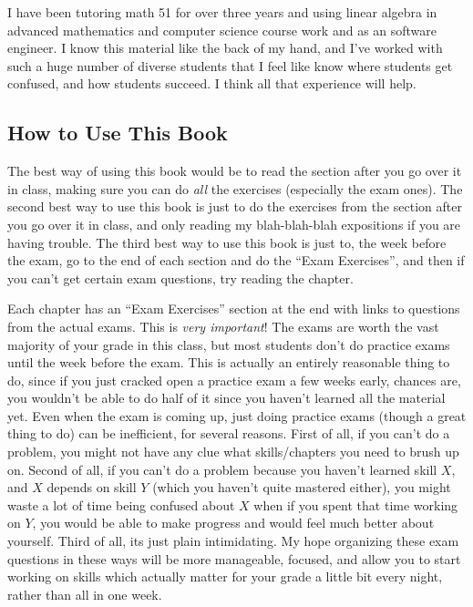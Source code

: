 I have been tutoring math 51 for over three years and using linear algebra in advanced mathematics and computer science course work and as an software engineer.  
I know this material like the back of my hand, and I've worked with such a huge number of diverse students that I feel like know where students get confused, and how students succeed.  
I think all that experience will help.

\subsection*{How to Use This Book}

The best way of using this book would be to read the section after you go over it in class, making sure you can do \emph{all} the exercises (especially the exam ones).
The second best way to use this book is just to do the exercises from the section after you go over it in class, and only reading my blah-blah-blah expositions if you are having trouble.
The third best way to use this book is just to, the week before the exam, go to the end of each section and do the ``Exam Exercises'', and then if you can't get certain exam questions, try reading the chapter.

Each chapter has an ``Exam Exercises'' section at the end with links to questions from the actual exams.
This is \emph{very important}!
The exams are worth the vast majority of your grade in this class, but most students don't do practice exams until the week before the exam.
This is actually an entirely reasonable thing to do, since if you just cracked open a practice exam a few weeks early, chances are, you wouldn't be able to do half of it since you haven't learned all the material yet.
Even when the exam is coming up, just doing practice exams (though a great thing to do) can be inefficient, for several reasons.
First of all, if you can't do a problem, you might not have any clue what skills/chapters you need to brush up on.
Second of all, if you can't do a problem because you haven't learned skill $X$, and $X$ depends on skill $Y$ (which you haven't quite mastered either), you might waste a lot of time being confused about $X$ when if you spent that time working on $Y$, you would be able to make progress and would feel much better about yourself.
Third of all, its just plain intimidating.
My hope organizing these exam questions in these ways will be more manageable, focused, and allow you to start working on skills which actually matter for your grade a little bit every night, rather than all in one week.

